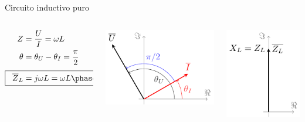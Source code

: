 \documentclass[aspectratio=169, usenames,svgnames,dvipsnames]{beamer}
\begin{document}
\begin{frame}{Circuito inductivo puro}
\begin{columns}
\begin{column}{0.3\columnwidth}
        \vspace{-4mm}
        \begin{align*}
          Z &= \frac{U}{I} = \omega L\\
          \theta &= \theta_U - \theta_I = \frac{\pi}{2}\\[3pt]
          \Aboxed{\;\; \overline{Z}_L &= j\omega L = \omega L \phase{\ang{90}} \;\;}
        \end{align*}
    \end{column}        
    \begin{column}{0.4\columnwidth}
        \begin{center}
            \includegraphics[height=0.4\textheight]{../figs/fasorInductancia_VI.pdf}
        \end{center}
    \end{column}  
    \begin{column}{0.3\columnwidth}
        \begin{center}
            \includegraphics[height=0.4\textheight]{../figs/fasorInductancia.pdf}
        \end{center}
    \end{column}
    \end{columns}
\end{frame}

\end{document}
